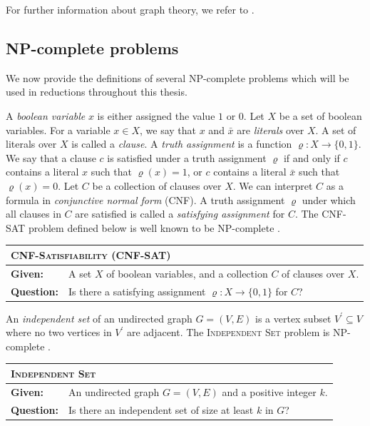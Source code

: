 \documentclass[
    12pt,               %
    a4paper,            %
    bibtotoc,           %
    pointlessnumbers,   %
    ngerman,            %
    titlepage,          %
    leqno,              %
    ]{scrarticle}       %
\begin{document}
For further information about graph theory, we refer to \textcite{W01}.



\subsection{NP-complete problems}

We now provide the definitions of several NP-complete problems which will be used in reductions throughout this thesis.



\clearpage

A \emph{boolean variable} $x$ is either assigned the value $1$ or $0$. Let $X$ be a set of boolean variables. For a variable $x \in X$, we say that $x$ and $\bar{x}$ are \emph{literals} over $X$. A set of literals over $X$ is called a \emph{clause}. A \emph{truth assignment} is a function $\varrho : X \rightarrow \{0, 1\}$. We say that a clause $c$ is satisfied under a truth assignment $\varrho$ if and only if $c$ contains a literal $x$ such that $\varrho(x) = 1$, or $c$ contains a literal $\bar{x}$ such that $\varrho(x) = 0$. Let $C$ be a collection of clauses over $X$. We can interpret $C$ as a formula in \emph{conjunctive normal form} (CNF). A truth assignment $\varrho$ under which all clauses in $C$ are satisfied is called a \emph{satisfying assignment} for $C$. The CNF-SAT problem defined below is well known to be NP-complete \cite{K72}.

\begin{tabularx}{\textwidth}{lX}
\hline
\multicolumn{2}{l}{
\textsc{CNF-Satisfiability} (CNF-SAT)
} \\
\hline
\textbf{Given:} &
A set $X$ of boolean variables, and a collection $C$ of clauses over $X$. \\
\textbf{Question:} &
Is there a satisfying assignment $\varrho : X \rightarrow \{0, 1\}$ for $C$? \\
\hline
\end{tabularx}

\vspace{\baselineskip}



An \emph{independent set} of an undirected graph $G = (V, E)$ is a vertex subset $V^\prime \subseteq V$ where no two vertices in $V^\prime$ are adjacent. The \textsc{Independent Set} problem is NP-complete \cite{K72}.

\begin{tabularx}{\textwidth}{lX}
\hline
\multicolumn{2}{l}{
\textsc{Independent Set}
} \\
\hline
\textbf{Given:} &
An undirected graph $G = (V, E)$ and a positive integer $k$. \\
\textbf{Question:} &
Is there an independent set of size at least $k$ in $G$? \\
\hline
\end{tabularx}
\end{document}
